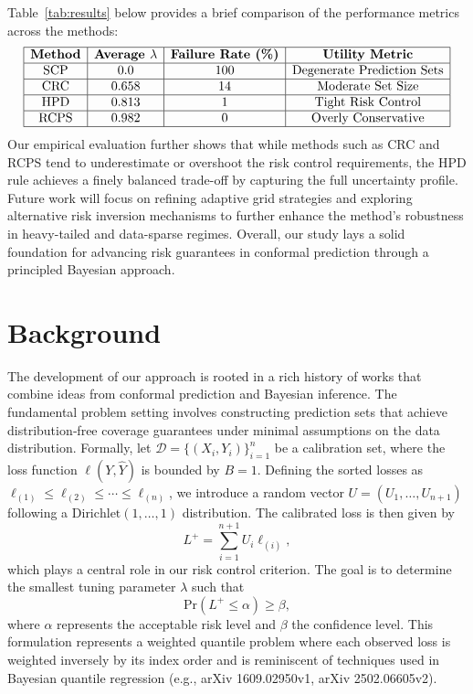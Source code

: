\documentclass{article}
\begin{document}
Table~\ref{tab:results} below provides a brief comparison of the performance metrics across the methods:
\[
\begin{array}{|c|c|c|c|}
\hline
\textbf{Method} & \textbf{Average } \lambda & \textbf{Failure Rate (\%)} & \textbf{Utility Metric} \\
\hline
\text{SCP} & 0.0 & 100 & \text{Degenerate Prediction Sets} \\
\hline
\text{CRC} & 0.658 & 14 & \text{Moderate Set Size} \\
\hline
\text{HPD} & 0.813 & 1 & \text{Tight Risk Control} \\
\hline
\text{RCPS} & 0.982 & 0 & \text{Overly Conservative} \\
\hline
\end{array}
\]
Our empirical evaluation further shows that while methods such as CRC and RCPS tend to underestimate or overshoot the risk control requirements, the HPD rule achieves a finely balanced trade-off by capturing the full uncertainty profile. Future work will focus on refining adaptive grid strategies and exploring alternative risk inversion mechanisms to further enhance the method's robustness in heavy-tailed and data-sparse regimes. Overall, our study lays a solid foundation for advancing risk guarantees in conformal prediction through a principled Bayesian approach.

\section{Background}
The development of our approach is rooted in a rich history of works that combine ideas from conformal prediction and Bayesian inference. The fundamental problem setting involves constructing prediction sets that achieve distribution‐free coverage guarantees under minimal assumptions on the data distribution. Formally, let \(\mathcal{D} = \{(X_i, Y_i)\}_{i=1}^n\) be a calibration set, where the loss function \(\ell(Y, \hat{Y})\) is bounded by \(B=1\). Defining the sorted losses as \(\ell_{(1)} \le \ell_{(2)} \le \cdots \le \ell_{(n)}\), we introduce a random vector \(U = (U_1,\ldots, U_{n+1})\) following a \(\text{Dirichlet}(1,\ldots,1)\) distribution. The calibrated loss is then given by 
\[
L^+ = \sum_{i=1}^{n+1} U_i \ell_{(i)},
\]
which plays a central role in our risk control criterion. The goal is to determine the smallest tuning parameter \(\lambda\) such that 
\[
\mathrm{Pr}(L^+ \le \alpha) \ge \beta,
\]
where \(\alpha\) represents the acceptable risk level and \(\beta\) the confidence level. This formulation represents a weighted quantile problem where each observed loss is weighted inversely by its index order and is reminiscent of techniques used in Bayesian quantile regression (e.g., arXiv 1609.02950v1, arXiv 2502.06605v2).
\end{document}

